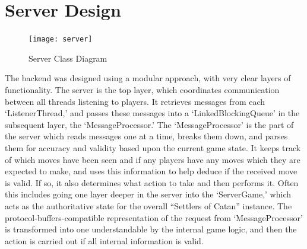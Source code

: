 \documentclass[a4paper,doc,draftfirst]{apa6}
\begin{document}
\section{Server Design}
\begin{figure}[hbtp]
      \texttt{[image: server]}
      \caption{Server Class Diagram}
\end{figure}
The backend was designed using a modular approach, with very clear layers of functionality. The server is the top layer, which coordinates communication between all threads listening to players. It retrieves messages from each ‘ListenerThread,’ and passes these messages into a ‘LinkedBlockingQueue’ in the subsequent layer, the ‘MessageProcessor.’ The ‘MessageProcessor’ is the part of the server which reads messages one at a time, breaks them down, and parses them for accuracy and validity based upon the current game state. It keeps track of which moves have been seen and if any players have any moves which they are expected to make, and uses this information to help deduce if the received move is valid. If so, it also determines what action to take and then performs it. Often this includes going one layer deeper in the server into the ‘ServerGame,’ which acts as the authoritative state for the overall “Settlers of Catan” instance. The protocol-buffers-compatible representation of the request from ‘MessageProcessor’ is transformed into one understandable by the internal game logic, and then the action is carried out if all internal information is valid.
\end{document}
